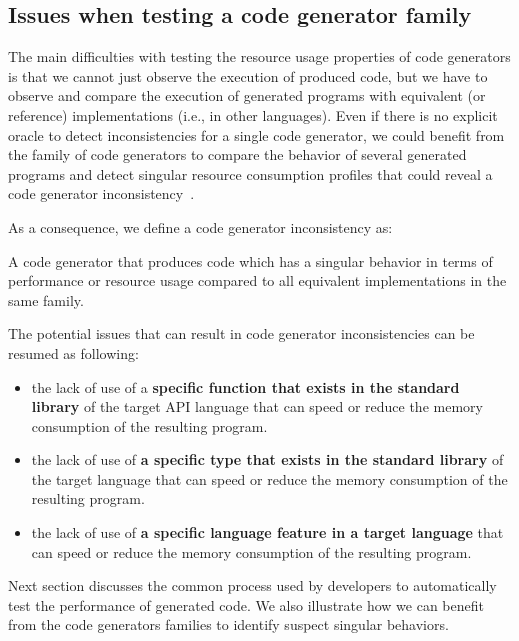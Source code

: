\subsection{Issues when testing a code generator family}

The main difficulties with testing the resource usage properties of code generators is that we cannot just observe the execution of produced code, but we have to observe and compare the execution of generated programs with equivalent (or reference) implementations (i.e., in other languages). Even if there is no explicit oracle to detect inconsistencies for a single code generator, we could benefit from the family of code generators to compare the behavior of several generated programs and detect singular resource consumption profiles that could reveal a code generator inconsistency~\cite{hundt2011loop}. 

As a consequence, we define a code generator inconsistency as:

\begin{mydef}
	
	A code generator that produces code which has a singular behavior in terms of performance or resource usage compared to all equivalent implementations in the same family.
\end{mydef}

The potential issues that can result in code generator inconsistencies can be resumed as following:
\begin{itemize}
	\setlength\itemsep{0em}
	\item  the lack of use of a \textbf{specific function that exists in the standard library} of the target API language  that can speed or reduce the memory consumption of the resulting program.
	\item the lack of use of \textbf{a specific type that exists in the standard library} of the target language  that can speed or reduce the memory consumption of the resulting program.
	\item  the lack of use of\textbf{ a specific language feature in a target language} that can speed or reduce the memory consumption of the resulting program. 
\end{itemize}

Next section discusses the common process used by developers to automatically test the performance of generated code. We also illustrate how we can benefit from the code generators families to identify suspect singular behaviors.


